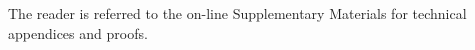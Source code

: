\documentclass[oupdraft]{bio}
\newcommand{\nn}{\nonumber}
\begin{document}
The reader is referred to the on-line Supplementary Materials for
technical appendices and proofs.




\end{document}

